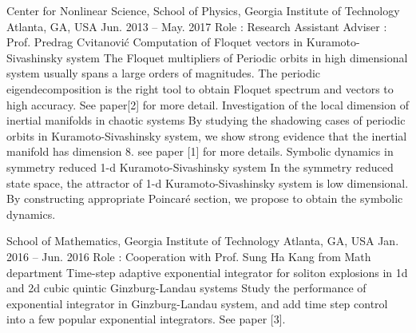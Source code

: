 


\begin{cventries}
  \cvresearch
  {Center for Nonlinear Science, School of Physics, Georgia Institute of Technology}
  {Atlanta, GA, USA}
  {Jun. 2013 -- May. 2017}
  {Role : Research Assistant \quad Adviser : Prof. Predrag Cvitanovi\'c }
  {
    \cvresearchitem
    {Computation of Floquet vectors in Kuramoto-Sivashinsky system}
    {The Floquet multipliers of Periodic orbits in high dimensional system usually spans a large orders of magnitudes. The periodic eigendecomposition is the right tool to obtain Floquet spectrum and vectors to high accuracy. See paper[2] for more detail.}
    \cvresearchitem
    {Investigation of the local dimension of inertial manifolds in chaotic systems}
    {By studying the shadowing cases of periodic orbits in        Kuramoto-Sivashinsky system, we show strong evidence that the inertial manifold has dimension 8. see paper [1] for more details. }
    \cvresearchitem
    {Symbolic dynamics in symmetry reduced 1-d Kuramoto-Sivashinsky system}
    {In the symmetry reduced state space, the attractor of  1-d Kuramoto-Sivashinsky system is low dimensional. By constructing appropriate Poincar\'e section, we propose to obtain the symbolic dynamics.}
  }

  \cvresearch
  {School of Mathematics, Georgia Institute of Technology} 
  {Atlanta, GA, USA}
  {Jan. 2016 -- Jun. 2016} 
  {Role : Cooperation with Prof. Sung Ha Kang from Math department}
  {
    \cvresearchitem
    {Time-step adaptive exponential integrator for soliton explosions in 1d and 2d cubic quintic Ginzburg-Landau systems}
    {Study the performance of exponential integrator in Ginzburg-Landau system,      and add time step control into a few popular exponential integrators. See paper [3].}
  }


\end{cventries}
